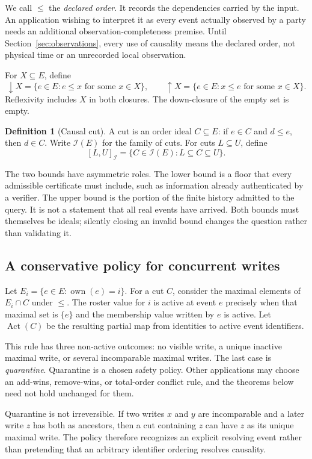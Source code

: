 \documentclass[11pt]{article}
\theoremstyle{definition}
\newtheorem{definition}[theorem]{Definition}
\newcommand{\Id}{\mathcal I}
\newcommand{\Act}{\operatorname{Act}}
\newcommand{\own}{\operatorname{own}}
\begin{document}
We call $\leq$ the \emph{declared order}. It records the dependencies carried by the input. An application wishing to interpret it as every event actually observed by a party needs an additional observation-completeness premise. Until Section~\ref{sec:observations}, every use of causality means the declared order, not physical time or an unrecorded local observation.

For $X\subseteq E$, define
\[
 \downarrow X=\{e\in E: e\leq x\text{ for some }x\in X\},\qquad
 \uparrow X=\{e\in E: x\leq e\text{ for some }x\in X\}.
\]
Reflexivity includes $X$ in both closures. The down-closure of the empty set is empty.

\begin{definition}[Causal cut]
A cut is an order ideal $C\subseteq E$: if $e\in C$ and $d\leq e$, then $d\in C$. Write $\Id(E)$ for the family of cuts. For cuts $L\subseteq U$, define
\[
 [L,U]_{\Id}=\{C\in\Id(E):L\subseteq C\subseteq U\}.
\]
\end{definition}

The two bounds have asymmetric roles. The lower bound is a floor that every admissible certificate must include, such as information already authenticated by a verifier. The upper bound is the portion of the finite history admitted to the query. It is not a statement that all real events have arrived. Both bounds must themselves be ideals; silently closing an invalid bound changes the question rather than validating it.

\subsection{A conservative policy for concurrent writes}
Let $E_i=\{e\in E:\own(e)=i\}$. For a cut $C$, consider the maximal elements of $E_i\cap C$ under $\leq$. The roster value for $i$ is active at event $e$ precisely when that maximal set is $\{e\}$ and the membership value written by $e$ is active. Let $\Act(C)$ be the resulting partial map from identities to active event identifiers.

This rule has three non-active outcomes: no visible write, a unique inactive maximal write, or several incomparable maximal writes. The last case is \emph{quarantine}. Quarantine is a chosen safety policy. Other applications may choose an add-wins, remove-wins, or total-order conflict rule, and the theorems below need not hold unchanged for them.

Quarantine is not irreversible. If two writes $x$ and $y$ are incomparable and a later write $z$ has both as ancestors, then a cut containing $z$ can have $z$ as its unique maximal write. The policy therefore recognizes an explicit resolving event rather than pretending that an arbitrary identifier ordering resolves causality.
\end{document}
